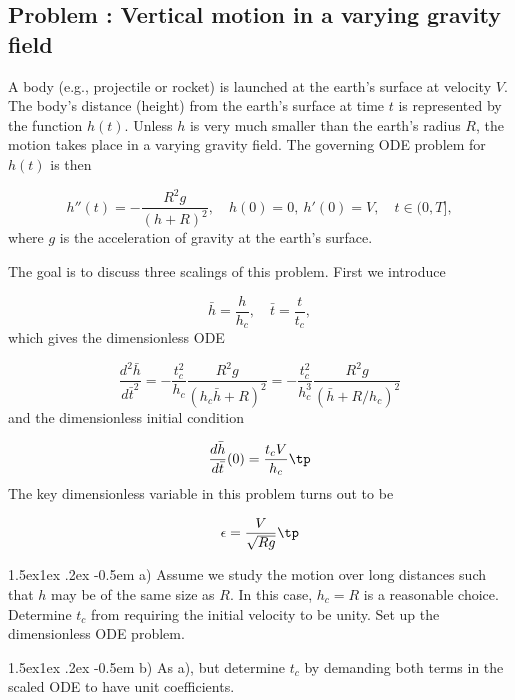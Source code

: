 \documentclass[graybox,envcountchap,sectrefs,final]{svmonodo}
\makeatletter
\newcounter{doconce:movie:counter}
\newenvironment{doconceexercise}{}{}
\newcounter{doconceexercisecounter}
\newcommand\subex{\@startsection{paragraph}{4}{\z@}%
                  {1.5ex\@plus1ex \@minus.2ex}%
                  {-0.5em}%
                  {\normalfont\normalsize\bfseries}}
\makeatother
\begin{document}
\begin{doconceexercise}

\subsection*{Problem \thedoconceexercisecounter: Vertical motion in a varying gravity field}

\label{scale:vib:exer:rocket}

A body (e.g., projectile or rocket) is launched at the earth's surface
at velocity $V$. The body's distance (height) from the earth's surface
at time $t$ is represented by the function $h(t)$.
Unless $h$ is very much smaller than the earth's radius $R$, the motion
takes place in a varying gravity field. The governing ODE problem for
$h(t)$ is then

\begin{equation}
h''(t) = -\frac{R^2g}{(h+R)^2},\quad h(0)=0,\ h'(0)=V,\quad t\in (0,T],
\end{equation}
where $g$ is the acceleration of gravity at the earth's surface.

The goal is to discuss three scalings of this problem. First we introduce

\[ \bar h = \frac{h}{h_c},\quad \bar t = \frac{t}{t_c},\]
which gives the dimensionless ODE

\[
\frac{d^2\bar h}{d\bar t^2} = -\frac{t_c^2}{h_c}\frac{R^2g}{(h_c\bar h+R)^2}
= -\frac{t_c^2}{h_c^3}\frac{R^2g}{\left(\bar h+ R/h_c\right)^2}
\]
and the dimensionless initial condition

\[ \frac{d\bar h}{d\bar t}(0) = \frac{t_cV}{h_c}\tp\]
The key dimensionless variable in this problem turns out to be

\[ \epsilon = \frac{V}{\sqrt{Rg}}\tp\]


\subex{a)}
Assume we study the motion over long distances such that
$h$ may be of the same size as $R$. In this case, $h_c=R$ is a
reasonable choice. Determine $t_c$ from requiring the initial velocity
to be unity. Set up the dimensionless ODE problem.



\subex{b)}
As a), but determine $t_c$ by demanding both terms in the scaled ODE to
have unit coefficients.




\end{doconceexercise}
\end{document}
